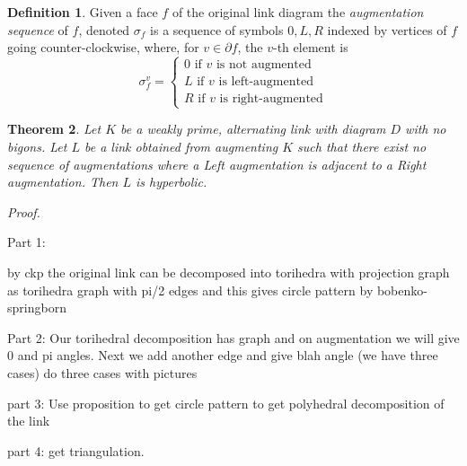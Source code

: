 \documentclass[11pt]{amsart}
\theoremstyle{plain}
\newtheorem{theorem}{Theorem}[section]
\theoremstyle{definition}
\newtheorem{define}[theorem]{Definition}
\begin{document}
\begin{define}
Given a face $f$ of the original link diagram the \emph{augmentation sequence} of $f$, denoted $\sigma_f$ is a sequence of symbols $0, L, R$ indexed by vertices of $f$ going counter-clockwise, where, for $v \in \partial f$, the $v$-th element is
\[
\sigma_f^v = 
\begin{cases}
0 \text{ if $v$ is not augmented} \\
L \text{ if $v$ is left-augmented} \\
R \text{ if $v$ is right-augmented}
\end{cases}
\]
\end{define}

\begin{theorem}
Let $K$ be a weakly prime, alternating link with diagram $D$ with no bigons. Let $L$ be a link obtained from augmenting $K$ such that there exist no sequence of augmentations where a Left augmentation is adjacent to a Right augmentation. Then $L$ is hyperbolic.
\end{theorem}

{\it Proof.}

Part 1:  


by ckp the original link can be decomposed into torihedra with projection graph as torihedra graph with pi/2 edges and this gives circle pattern by bobenko-springborn

Part 2: Our torihedral decomposition has graph and on augmentation we will give 0 and pi angles. Next we add another edge and give blah angle (we have three cases)
do three cases with pictures

part 3: Use proposition to get circle pattern to get polyhedral decomposition of the link 

part 4: get triangulation.  



\end{document}
